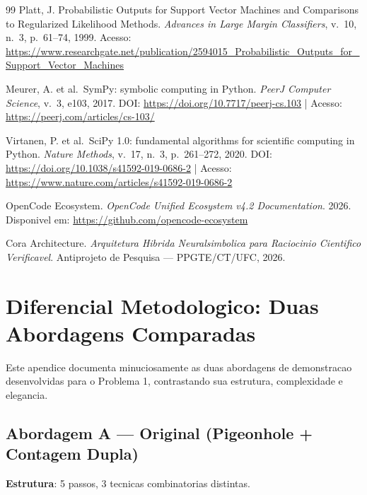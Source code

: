 \documentclass[5p]{elsarticle}
\theoremstyle{definition}
\begin{document}
\begin{thebibliography}{99}
Platt, J. Probabilistic Outputs for Support Vector Machines and Comparisons to Regularized Likelihood Methods. \textit{Advances in Large Margin Classifiers}, v.~10, n.~3, p.~61--74, 1999. Acesso: \url{https://www.researchgate.net/publication/2594015_Probabilistic_Outputs_for_Support_Vector_Machines}

Meurer, A. et al.\ SymPy: symbolic computing in Python. \textit{PeerJ Computer Science}, v.~3, e103, 2017. DOI: \url{https://doi.org/10.7717/peerj-cs.103} | Acesso: \url{https://peerj.com/articles/cs-103/}

Virtanen, P. et al.\ SciPy 1.0: fundamental algorithms for scientific computing in Python. \textit{Nature Methods}, v.~17, n.~3, p.~261--272, 2020. DOI: \url{https://doi.org/10.1038/s41592-019-0686-2} | Acesso: \url{https://www.nature.com/articles/s41592-019-0686-2}

OpenCode Ecosystem. \textit{OpenCode Unified Ecosystem v4.2 Documentation}. 2026. Disponivel em: \url{https://github.com/opencode-ecosystem}

Cora Architecture. \textit{Arquitetura Hibrida Neuralsimbolica para Raciocinio Cientifico Verificavel}. Antiprojeto de Pesquisa --- PPGTE/CT/UFC, 2026.

\end{thebibliography}

\appendix

\section{Diferencial Metodologico: Duas Abordagens Comparadas}\label{app:diferencial}

Este apendice documenta minuciosamente as duas abordagens de demonstracao desenvolvidas
para o Problema 1, contrastando sua estrutura, complexidade e elegancia.

\subsection{Abordagem A — Original (Pigeonhole + Contagem Dupla)}

\textbf{Estrutura}: 5 passos, 3 tecnicas combinatorias distintas.
\end{document}
